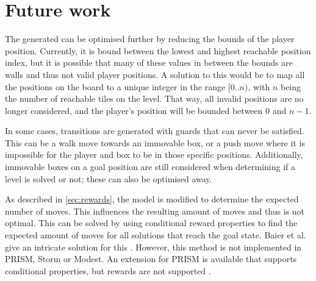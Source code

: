 \section{Future work}
The generated can be optimised further by reducing the bounds of the player position. Currently, it is bound between the lowest and highest reachable position index, but it is possible that many of these values in between the bounds are walls and thus not valid player positions. A solution to this would be to map all the positions on the board to a unique integer in the range $[0..n)$, with $n$ being the number of reachable tiles on the level. That way, all invalid positions are no longer considered, and the player's position will be bounded between $0$ and $n-1$.

In some cases, transitions are generated with guards that can never be satisfied. This can be a walk move towards an immovable box, or a push move where it is impossible for the player and box to be in those specific positions. Additionally, immovable boxes on a goal position are still considered when determining if a level is solved or not; these can also be optimised away. 

As described in \autoref{sec:rewards}, the model is modified to determine the expected number of moves. This influences the resulting amount of moves and thus is not optimal. This can be solved by using conditional reward properties to find the expected amount of moves for all solutions that reach the goal state. Baier et al. give an intricate solution for this \cite{Baier2017}. However, this method is not implemented in PRISM, Storm or Modest. An extension for PRISM is available that supports conditional properties, but rewards are not supported \cite{Mrcker2017}.
